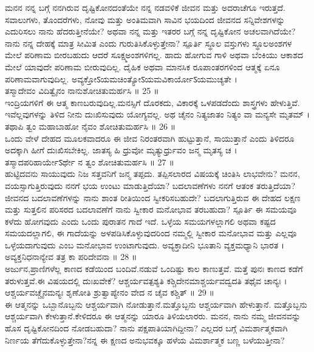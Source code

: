 ಮನನ 
 ನನ್ನ ಬಗ್ಗೆ ನನಗಿರುವ ದೃಷ್ಟಿಕೋನದಂತೆಯೇ ನನ್ನ ನಡವಳಿಕೆ ಜೀವನ ಮತ್ತು ಅದರಾಚೆಗೂ ಇರುತ್ತದೆ. ಸವಾಲುಗಳು, ತೊಂದರೆಗಳು, ನೋವು ಮತ್ತು ಅಂತಿಮವಾಗಿ ಸಾವಿನ ಭಯದಿಂದ ಜೀವನದ ಸನ್ನಿವೇಶಗಳನ್ನು ಎದುರಿಸಲು ನಾನು ಹೆದರುತ್ತೀನೆಯೇ? ಅಥವಾ ನನ್ನ ಮತ್ತು ಇತರರ ಬಗ್ಗೆ ನನ್ನ ದೃಷ್ಟಿಕೋನ ಅಚಲವಾಗಿದೆಯೇ? ನಾನು ನನ್ನ ದೇಹಕ್ಕೆ ಮಾತ್ರ ಸೀಮಿತ ಎಂದು ಗುರುತಿಸಿಕೊಳ್ಳುತ್ತೇನಾ?
 ಸ್ಪೂರ್ತಿ 
 ಸ್ಥೂಲ ವಸ್ತುಗಳು ಸ್ಥೂಲಅಂಶಗಳ ಮೇಲೆ ಪರಿಣಾಮ ಬೀರಬಹುದು ಆದರೆ ಸೂಕ್ಷ್ಮಅಂಶಗಳಿಗಲ್ಲ. ಹಾದು ಹೋಗುವ ಗಾಳಿ ಅಥವಾ ಬೆಂಕಿಯು ಆಕಾಶದ ಮೇಲೆ ಯಾವುದೇ ಪರಿಣಾಮ ಬೀರುವುದಿಲ್ಲ. ದೈಹಿಕ ಅಥವಾ ಮಾನಸಿಕ ರೂಪಾಂತರಗಳಿಂದ ಆತ್ಮಕ್ಕೆ ಏನೂ ಪರಿಣಾಮವಾಗುವುದಿಲ್ಲ.
ಅವ್ಯಕ್ತೋऽಯಮಚಿಂತ್ಯೋऽಯಮವಿಕಾರ್ಯೋऽಯಮುಚ್ಯತೇ ।\\
ತಸ್ಮಾದೇವಂ ವಿದಿತ್ವೈನಂ ನಾನುಶೋಚಿತುಮರ್ಹಸಿ ॥ 25 ॥\\
 ಇಂದ್ರಿಯಗಳಿಗೆ ಈ ಆತ್ಮ ಕಾಣಬರುವುದಿಲ್ಲ.ಮನಸ್ಸಿಗೆ ದೊರಕದು, ವಿಕಾರಕ್ಕೆ ಒಳಪಡದೆಂದು ಶಾಸ್ತ್ರಗಳು ಹೇಳುತ್ತಿವೆ. ಇವೆಲ್ಲವುಗಳನ್ನು ತಿಳಿದ ನೀನು ದುಃಖಿಸುವುದು ಯೋಗ್ಯವಲ್ಲ.
ಅಥ ಚೈನಂ ನಿತ್ಯಜಾತಂ ನಿತ್ಯಂ ವಾ ಮನ್ಯಸೇ ಮೃತಮ್ ।\\
ತಥಾಪಿ ತ್ವಂ ಮಹಾಬಾಹೋ ನೈವಂ ಶೋಚಿತುಮರ್ಹಸಿ ॥ 26 ॥\\
 ಒಂದು ವೇಳೆ ದೇಹದ ಮೂಲಕವಾದರೂ ಈ ಜೀವ ನಿರಂತರವಾಗಿ ಹುಟ್ಟುತ್ತಾನೆ, ಸಾಯುತ್ತಾನೆ ಎಂದು ತಿಳಿದರೂ ಅದಕ್ಕಾಗಿ ಹೀಗೆ ದುಃಖಿಸಬೇಕಿಲ್ಲ.
ಜಾತಸ್ಯ ಹಿ ಧ್ರುವೋ ಮೃತ್ಯುರ್ಧ್ರುವಂ ಜನ್ಮ ಮೃತಸ್ಯ ಚ ।\\
ತಸ್ಮಾದಪರಿಹಾರ್ಯೇऽರ್ಥೇ ನ ತ್ವಂ ಶೋಚಿತುಮರ್ಹಸಿ ॥ 27 ॥\\
 ಹುಟ್ಟಿದವನು ಸಾಯುವುದು ನಿಜ ಸತ್ತವನಿಗೆ ಜನ್ಮ ತಪ್ಪದು. ತಪ್ಪಿಸಲಾರದ ವಿಷಯಕ್ಕೆ ಚಿಂತಿಸಿ ಲಾಭವೇನು?
ಮನನ,
 ವಯಸ್ಸಾಗುತ್ತಿರುವುದು ನನಗೆ ಭಯ ಉಂಟು ಮಾಡುತ್ತಿದೆಯಾ? ಬದಲಾವಣೆಗಳು ನನಗೆ ಆತಂಕ ತರುತ್ತಿದೆಯಾ? ಜೀವನದ ಬದಲಾವಣೆಗಳನ್ನು ನಾನು ಶಾಂತ ರೀತಿಯಿಂದ ಸ್ವೀಕರಿಸಬಹುದೇ? ಬದಲಾಗುತ್ತಿರುವ ಈ ದೇಹದ ಲಕ್ಷಣ ಮತ್ತು ಸುತ್ತಲಿನ ಪರಿಸರದ ಬದಲಾವಣೆಗೆ ನಾನು ಸ್ವೀಕಾರ ಮನೋಭಾವ ತರಬಹುದಾ? 
 ಸ್ಪೂರ್ತಿ 
 ಈ ಸಮಯವೂ ಕಳೆದು ಹೋಗವುದು ಎಂದು ಒಂದು ಪುರಾತನ ಗಾದೆ ಇದೆ. ಒಳ್ಳೆಯ ಸಮಯಗಳಲ್ಲಾಗಲಿ ಅಥವಾ ಕಷ್ಟದ ಸಮಯದಲ್ಲಾಗಲಿ, ಈ ಗಾದೆಯನ್ನು ಅಳಪಡಿಸಿಕೊಳ್ಳುವುದರಿಂದ ನಮ್ಮಲ್ಲಿ ಸ್ವೀಕಾರ ಮನೋಭಾವ ಮತ್ತು ಎಲ್ಲವೂ ಒಳ್ಳೆಯದಾಗುವುದು ಎಂಬ ಮನೋಭಾವ ಉಂಟಾಗುವುದು.
ಅವ್ಯಕ್ತಾದೀನಿ ಭೂತಾನಿ ವ್ಯಕ್ತಮಧ್ಯಾನಿ ಭಾರತ ।\\
ಅವ್ಯಕ್ತನಿಧನಾನ್ಯೇವ ತತ್ರ ಕಾ ಪರಿದೇವನಾ ॥ 28 ॥\\
 ಅರ್ಜುನ,ಪ್ರಾಣಿಗಳೆಲ್ಲ ಕಾಣದ ಕಡೆಯಿಂದ ಬಂದಿವೆ.ನಡುವೆ ಒಂದಿಷ್ಟು ಕಾಲ ಕಾಣುತ್ತವೆ. ಮತ್ತೆ ಪುನಃ ಕಾಣದ ಕಡೆಗೆ ತರುಳುತ್ತವೆ.ಈ ವಿಷಯದಲ್ಲಿ ದುಃಖವೇಕೆ?
ಆಶ್ಚರ್ಯವತ್ಪಶ್ಯತಿ ಕಶ್ಚಿದೇನಮಾಶ್ಚರ್ಯವದ್ವದತಿ ತಥೈವ ಚಾನ್ಯಃ ।\\
ಆಶ್ಚರ್ಯವಚ್ಚೈನಮನ್ಯಃ ಶೃಣೋತಿ ಶ್ರುತ್ವಾಪ್ಯೇನಂ ವೇದ ನ ಚೈವ ಕಶ್ಚಿತ್ ॥ 29 ॥\\
 ಈ ಆತ್ಮನನ್ನು ಒಬ್ಬಾನೊಬ್ಬನು ಆಶ್ಚರ್ಯವಾಗಿ ನೋಡುತ್ತಾನೆ.ಮತ್ತೊಬ್ಬನು ಆಶ್ಚರ್ಯವಾಗಿ ಹೇಳುತ್ತಾನೆ. ಮತ್ತೊಬ್ಬನು ಆಶ್ಚರ್ಯವಾಗಿ ಕೇಳುತ್ತಾನೆ.ಕೇಳಿದರೂ ಈ ಆತ್ಮನನ್ನು ಯಾರೂ ತಿಳಿಯಲಾರರು.
ಮನನ,
 ನಾನು ನಮ್ಮ ಜೀವನವನ್ನು ಹೊಸ ದೃಷ್ಟಿಕೋನದಿಂದ ನೋಡಬಹುದಾ? ನಾನು ಪಕ್ಷಪಾತಿಯಾಗಿದ್ದೀನಾ? ಎಲ್ಲದರ ಬಗ್ಗೆ ವಿಮರ್ಶಾತ್ಮಕವಾಗಿ ನಿರ್ಣಯ ತೆಗೆದುಕೊಳ್ಳುತ್ತೇನಾ?ನನ್ನ ಈ ಕ್ಷಣದ ಅನುಭವಕ್ಕೂ ಹಳೆಯ  ವಿಮರ್ಶಾತ್ಮಕ ಬಣ್ಣ ಬಳೆಯುತ್ತೀನಾ?
